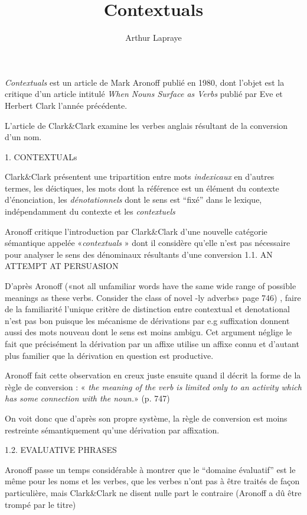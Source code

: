 \documentclass[a4paper,12pt]{article}
\author{Arthur Lapraye}
\title{Contextuals}
\begin{document}
 
 \maketitle
 

 \textit{Contextuals} est un article de Mark Aronoff publié en 1980, dont l'objet est la critique d'un article intitulé 
 \textit{When Nouns Surface as Verbs} publié par Eve et Herbert Clark l'année précédente. 
 
 
 L'article de Clark\&Clark examine les verbes anglais résultant de la conversion d'un nom. 
 
  1. CONTEXTUALs
  
  
 
 Clark\&Clark présentent une tripartition entre mots \textit{indexicaux} en d'autres termes, les déictiques, 
 les mots dont la référence est un élément du contexte d'énonciation, les \textit{dénotationnels} dont le sens est ``fixé'' dans le lexique, 
 indépendamment du contexte et les \textit{contextuels}
	
 Aronoff critique l'introduction par Clark\&Clark d'une nouvelle catégorie sémantique appelée «\textit{contextuals} » 
 dont il considère qu'elle n'est pas nécessaire pour analyser le sens des dénominaux résultants d'une conversion
 1.1. AN ATTEMPT AT PERSUASION
 
 
D'après Aronoff («not all unfamiliar words have the same wide range of possible meanings as these
verbs. Consider the class of novel -ly adverbs» page 746) , faire de la familiarité l'unique critère de distinction entre contextual et denotational 
n'est pas bon puisque les mécanisme de dérivations par e.g suffixation donnent aussi des mots nouveau dont le sens est moins ambigu. 
Cet argument néglige le fait que précisément la dérivation par un affixe utilise un affixe connu 
et d'autant plus familier que la dérivation en question est productive.



Aronoff fait cette observation en creux juste ensuite quand il décrit la forme de la règle de conversion : 
« \textit{the meaning of the verb is limited only to an activity which has some connection with the noun.}» (p. 747) 

On voit donc que d'après son propre système, la règle de conversion est moins restreinte sémantiquement qu'une dérivation par affixation. 

 
 1.2. EVALUATIVE PHRASES
 
 
 Aronoff passe un temps considérable à montrer que le ``domaine évaluatif'' est le même pour les noms et les verbes, que les verbes n'ont pas 
 à être traités de façon particulière, mais Clark\&Clark ne disent nulle part le contraire (Aronoff a dû être trompé par le titre) 
 
\end{document}
